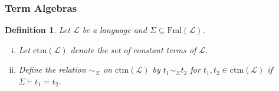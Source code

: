 \documentclass[11pt]{article}
\newcommand{\proves}{\vdash}
\newcommand{\ctm}{\textrm{ctm}}
\newcommand{\Fml}{\textrm{Fml}}
\newtheorem{definition}[theorem]{Definition}
\newcommand{\mcal}[1]{\mathcal{#1}}
\begin{document}
\subsubsection*{Term Algebras}

\begin{definition}
Let $\mcal{L}$ be a language and $\Sigma\subseteq \Fml(\mcal{L})$.
\begin{enumerate}[(i)]
\item
Let $\ctm(\mcal{L})$ denote the set of constant terms of $\mcal{L}$.
\item
Define the relation $\sim_\Sigma$ on $\ctm(\mcal{L})$ by $t_1\sim_\Sigma t_2$ for $t_1,t_2\in \ctm(\mcal{L})$ if $\Sigma \proves t_1=t_2$.
\end{enumerate}
\end{definition}
\end{document}
